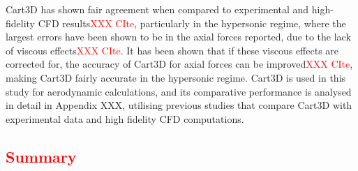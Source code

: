 Cart3D has shown fair agreement when compared to experimental and high-fidelity CFD results\textcolor{red}{XXX CIte}, particularly in the hypersonic regime, where the largest errors have been shown to be in the axial forces reported, due to the lack of viscous effects\textcolor{red}{XXX CIte}. 
It has been shown that if these viscous effects are corrected for, the accuracy of Cart3D for axial forces can be improved\textcolor{red}{XXX CIte}, making Cart3D fairly accurate in the hypersonic regime. Cart3D is used in this study for aerodynamic calculations, and its comparative performance is analysed in detail in Appendix XXX, utilising previous studies that compare Cart3D with experimental data and high fidelity CFD computations. 




      \textcolor{red}{
      \section{Summary}
    }

